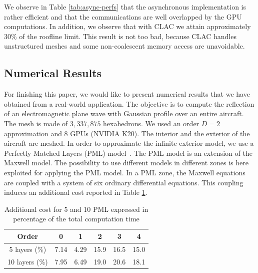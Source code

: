 \documentclass{svmult}
\begin{document}
We observe in Table \ref{tab:async-perfs} that the asynchronous
implementation is rather efficient and that the communications are
well overlapped by the GPU computations. In addition, we observe that
with CLAC we attain approximately $30\%$ of the roofline limit. This
result is not too bad, because CLAC handles unstructured meshes and
some non-coalescent memory access are unavoidable.


\subsection{Numerical Results}


For finishing this paper, we would like to present numerical results
that we have obtained from a real-world application. The objective is
to compute the reflection of an electromagnetic plane wave with
Gaussian profile over an entire aircraft. The mesh is made of
$3,337,875$ hexahedrons. We used an order $D=2$ approximation and 8
GPUs (NVIDIA K20). The interior and the exterior of the aircraft are
meshed. In order to approximate the infinite exterior model, we use a
Perfectly Matched Layers (PML) model~\cite{berenger}. The PML model is
an extension of the Maxwell model. The possibility to use different
models in different zones is here exploited for applying the PML
model. In a PML zone, the Maxwell equations are coupled with a system
of six ordinary differential equations. This coupling induces an
additional cost reported in Table \ref{tab:cost_pml}.


\begin{table}[h]
  \centering
  \caption{Additional cost for 5 and 10 PML expressed in percentage of the
    total computation time}
  \label{tab:cost_pml}
  \begin{tabular}[h]{|c||c|c|c|c|c|}
    \hline
             Order &    0 &    1 &    2 &    3 &    4 \\ \hline
     5 layers (\%) & 7.14 & 4.29 & 15.9 & 16.5 & 15.0 \\ \hline
    10 layers (\%) & 7.95 & 6.49 & 19.0 & 20.6 & 18.1 \\ \hline
  \end{tabular}
\end{table}

%
%
%
%
%
\end{document}

